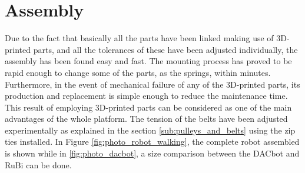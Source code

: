 \section{Assembly} %
\label{sec:assembly}
Due to the fact that basically all the parts have been linked making use of 3D-printed parts, and all the tolerances of these have been adjusted individually, the assembly has been found easy and fast.
The mounting process has proved to be rapid enough to change some of the parts, as the springs, within minutes.
Furthermore, in the event of mechanical failure of any of the 3D-printed parts, its production and replacement is simple enough to reduce the maintenance time.
This result of employing 3D-printed parts can be considered as one of the main advantages of the whole platform.
The tension of the belts have been adjusted experimentally as explained in the section \ref{sub:pulleys_and_belts} using the zip ties installed.
In Figure \ref{fig:photo_robot_walking}, the complete robot assembled is shown while in \ref{fig:photo_dacbot}, a size comparison between the DACbot \cite{dacbot1} and RuBi can be done.


